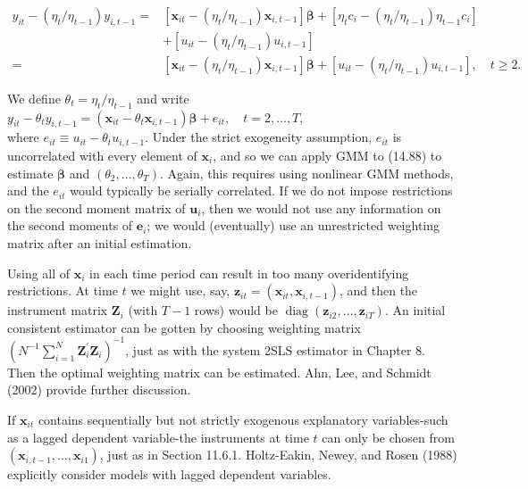 \documentclass[10pt]{article}
\begin{document}
$$
\begin{aligned}
y_{i t}-\left(\eta_{t} / \eta_{t-1}\right) y_{i, t-1}= & {\left[\mathbf{x}_{i t}-\left(\eta_{t} / \eta_{t-1}\right) \mathbf{x}_{i, t-1}\right] \boldsymbol{\beta}+\left[\eta_{t} c_{i}-\left(\eta_{t} / \eta_{t-1}\right) \eta_{t-1} c_{i}\right] } \\
& +\left[u_{i t}-\left(\eta_{t} / \eta_{t-1}\right) u_{i, t-1}\right] \\
= & {\left[\mathbf{x}_{i t}-\left(\eta_{t} / \eta_{t-1}\right) \mathbf{x}_{i, t-1}\right] \boldsymbol{\beta}+\left[u_{i t}-\left(\eta_{t} / \eta_{t-1}\right) u_{i, t-1}\right], \quad t \geq 2 . }
\end{aligned}
$$

We define $\theta_{t}=\eta_{t} / \eta_{t-1}$ and write\\
$y_{i t}-\theta_{t} y_{i, t-1}=\left(\mathbf{x}_{i t}-\theta_{t} \mathbf{x}_{i, t-1}\right) \boldsymbol{\beta}+e_{i t}, \quad t=2, \ldots, T$,\\
where $e_{i t} \equiv u_{i t}-\theta_{t} u_{i, t-1}$. Under the strict exogeneity assumption, $e_{i t}$ is uncorrelated with every element of $\mathbf{x}_{i}$, and so we can apply GMM to (14.88) to estimate $\boldsymbol{\beta}$ and $\left(\theta_{2}, \ldots, \theta_{T}\right)$. Again, this requires using nonlinear GMM methods, and the $e_{i t}$ would typically be serially correlated. If we do not impose restrictions on the second moment matrix of $\mathbf{u}_{i}$, then we would not use any information on the second moments of $\mathbf{e}_{i}$; we would (eventually) use an unrestricted weighting matrix after an initial estimation.

Using all of $\mathbf{x}_{i}$ in each time period can result in too many overidentifying restrictions. At time $t$ we might use, say, $\mathbf{z}_{i t}=\left(\mathbf{x}_{i t}, \mathbf{x}_{i, t-1}\right)$, and then the instrument matrix $\mathbf{Z}_{i}$ (with $T-1$ rows) would be $\operatorname{diag}\left(\mathbf{z}_{i 2}, \ldots, \mathbf{z}_{i T}\right)$. An initial consistent estimator can be gotten by choosing weighting matrix $\left(N^{-1} \sum_{i=1}^{N} \mathbf{Z}_{i}^{\prime} \mathbf{Z}_{i}\right)^{-1}$, just as with the system 2SLS estimator in Chapter 8. Then the optimal weighting matrix can be estimated. Ahn, Lee, and Schmidt (2002) provide further discussion.

If $\mathbf{x}_{i t}$ contains sequentially but not strictly exogenous explanatory variables-such as a lagged dependent variable-the instruments at time $t$ can only be chosen from $\left(\mathbf{x}_{i, t-1}, \ldots, \mathbf{x}_{i 1}\right)$, just as in Section 11.6.1. Holtz-Eakin, Newey, and Rosen (1988) explicitly consider models with lagged dependent variables.
\end{document}
